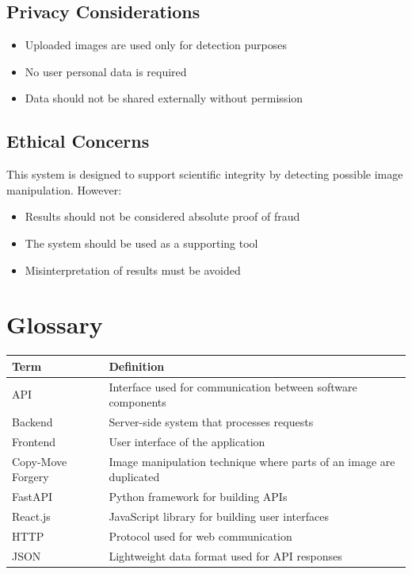 \documentclass[12pt]{article}
\begin{document}
\subsection{Privacy Considerations}

\begin{itemize}
    \item Uploaded images are used only for detection purposes
    \item No user personal data is required
    \item Data should not be shared externally without permission
\end{itemize}

\subsection{Ethical Concerns}

This system is designed to support scientific integrity by detecting possible image
manipulation. However:

\begin{itemize}
    \item Results should not be considered absolute proof of fraud
    \item The system should be used as a supporting tool
    \item Misinterpretation of results must be avoided
\end{itemize}

\section{Glossary}

\begin{longtable}{|p{4cm}|p{9cm}|}
\hline
\textbf{Term} & \textbf{Definition} \\
\hline
API & Interface used for communication between software components \\
\hline
Backend & Server-side system that processes requests \\
\hline
Frontend & User interface of the application \\
\hline
Copy-Move Forgery & Image manipulation technique where parts of an image are duplicated \\
\hline
FastAPI & Python framework for building APIs \\
\hline
React.js & JavaScript library for building user interfaces \\
\hline
HTTP & Protocol used for web communication \\
\hline
JSON & Lightweight data format used for API responses \\
\hline
\end{longtable}
\end{document}
